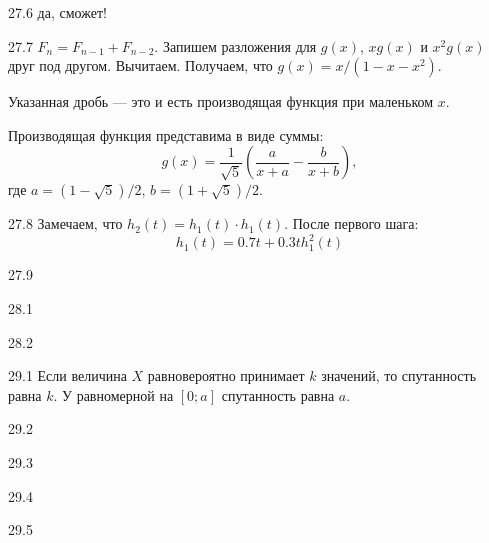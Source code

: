 \begin{solution}{{27.6}}
  да, сможет!
\end{solution}
\protect \hypertarget {soln:27.7}{}
\begin{solution}{{27.7}}
$F_n = F_{n-1} + F_{n-2}$.
Запишем разложения для $g(x)$, $xg(x)$ и $x^2 g(x)$ друг под другом. Вычитаем. Получаем, что $g(x) = x/(1-x-x^2)$.

Указанная дробь — это и есть производящая функция при маленьком $x$.

Производящая функция представима в виде суммы:
\[
g(x) = \frac{1}{\sqrt{5}}\left( \frac{a}{x+a} - \frac{b}{x+b}  \right),
\]
где $a=(1-\sqrt{5})/2$, $b=(1+\sqrt{5})/2$.
\end{solution}
\protect \hypertarget {soln:27.8}{}
\begin{solution}{{27.8}}
Замечаем, что $h_2(t)=h_1(t)\cdot h_1(t)$. После первого шага:
\[
h_1(t) = 0.7t + 0.3th^2_1(t)
\]
\end{solution}
\protect \hypertarget {soln:27.9}{}
\begin{solution}{{27.9}}

\end{solution}
\protect \hypertarget {soln:28.1}{}
\begin{solution}{{28.1}}
\end{solution}
\protect \hypertarget {soln:28.2}{}
\begin{solution}{{28.2}}
\end{solution}
\protect \hypertarget {soln:29.1}{}
\begin{solution}{{29.1}}
  Если величина $X$ равновероятно принимает $k$ значений, то спутанность равна $k$. У равномерной на $[0;a]$ спутанность равна $a$.
\end{solution}
\protect \hypertarget {soln:29.2}{}
\begin{solution}{{29.2}}
\end{solution}
\protect \hypertarget {soln:29.3}{}
\begin{solution}{{29.3}}
\end{solution}
\protect \hypertarget {soln:29.4}{}
\begin{solution}{{29.4}}
\end{solution}
\protect \hypertarget {soln:29.5}{}
\begin{solution}{{29.5}}
\end{solution}
